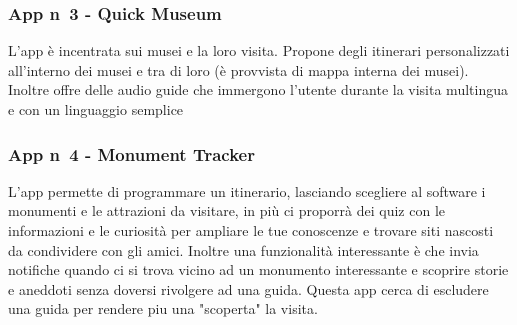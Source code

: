 \subsubsection*{App n\degree \ 3 - Quick Museum}
L'app è incentrata sui musei e la loro visita. Propone degli itinerari personalizzati all'interno dei musei e tra di loro (è provvista di mappa interna dei musei).
Inoltre offre delle audio guide che immergono l'utente durante la visita multingua e con un linguaggio semplice

\subsubsection*{App n\degree \ 4 - Monument Tracker}
L'app permette di programmare un itinerario, lasciando scegliere al software i monumenti e le attrazioni da visitare, in più ci proporrà dei quiz con le informazioni e le curiosità per ampliare le tue conoscenze e trovare siti nascosti da condividere con gli amici. Inoltre una funzionalità interessante è che invia notifiche quando ci si trova vicino ad un monumento interessante e scoprire storie e aneddoti senza doversi rivolgere ad una guida.
Questa app cerca di escludere una guida per rendere piu una "scoperta" la visita.